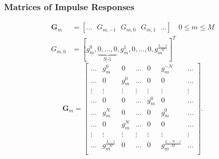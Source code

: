 \documentclass{beamer}
\begin{document}
\begin{frame}
\frametitle{Matrices of Impulse Responses}
\begin{align}
  \pmb{G}_m &=[\dots\text{ }G_{m,-1}\text{ }G_{m,0}\text{ }G_{m,1}\text{ }\dots]\quad 0\leq m\leq M \\
  G_{m,0} &=[g^0_m,\underbrace{0,\dots,0}_\text{N-1},g^1_m,0,\dots,0,g^{\frac{L-1}{M}}_m]^T
\end{align}
\begin{equation}
    \pmb{G}_m = \begin{bmatrix}
      \dots & g_m^0 & 0 & \dots & 0 & g_m^{-N} & \dots \\%
      \dots & 0 & g_m^0 & \dots & 0 & 0 & \dots \\%
      \vdots & \vdots & \vdots & \vdots & \vdots & \vdots & \vdots\\%
      \dots & 0 & 0 & \dots & g_m^0 & 0 & \dots \\%
      \dots & g_m^{N} & 0 & \dots & 0 & g_m^{0} & \dots \\%
      \dots & 0 & g_m^N & \dots & 0 & 0 & \dots \\%
      \vdots & \vdots & \vdots & \vdots & \vdots & \vdots & \vdots\\%
      \dots & g_m^{\frac{L-1}{M}} & 0 & \dots & 0 & g_m^{\frac{L-N-1}{M}} & \dots \\%
    \end{bmatrix}.
\end{equation}
\end{frame}
\end{document}
